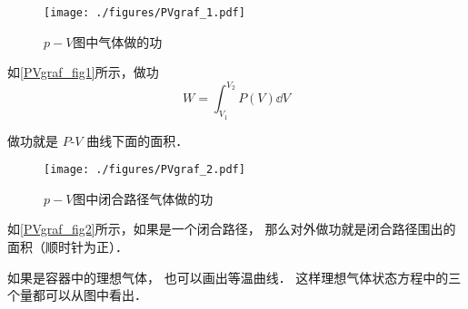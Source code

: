 

\begin{figure}[ht]
\centering
\texttt{[image: ./figures/PVgraf\_1.pdf]}
\caption{$p-V$图中气体做的功} \label{PVgraf_fig1}
\end{figure}

如\autoref{PVgraf_fig1}所示，做功
\begin{equation}\label{PVgraf_eq1}
W = \int_{V_1}^{V_2}P(V) \dd{V}
\end{equation}

做功就是 $P$-$V$ 曲线下面的面积． 

\begin{figure}[ht]
\centering
\texttt{[image: ./figures/PVgraf\_2.pdf]}
\caption{$p-V$图中闭合路径气体做的功} \label{PVgraf_fig2}
\end{figure}

如\autoref{PVgraf_fig2}所示，如果是一个闭合路径， 那么对外做功就是闭合路径围出的面积（顺时针为正）．

如果是容器中的理想气体， 也可以画出等温曲线． 这样理想气体状态方程中的三个量都可以从图中看出．
  